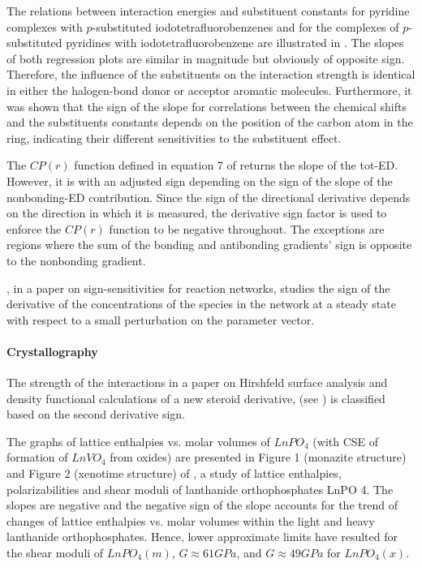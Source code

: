 \documentclass[11pt]{book}
\begin{document}
The relations between interaction energies and substituent constants
for pyridine complexes with $p$-substituted iodotetrafluorobenzenes
and for the complexes of $p$-substituted pyridines with iodotetrafluorobenzene
are illustrated in \cite{szatylowicz2015substituent}. The slopes
of both regression plots are similar in magnitude but obviously of
opposite sign. Therefore, the influence of the substituents on the
interaction strength is identical in either the halogen-bond donor
or acceptor aromatic molecules. Furthermore, it was shown that the
sign of the slope for correlations between the chemical shifts and
the substituents constants depends on the position of the carbon atom
in the ring, indicating their different sensitivities to the substituent
effect.

The $CP\left(r\right)$ function defined in equation 7 of \cite{de2018faldi}
returns the slope of the tot-ED. However, it is with an adjusted sign
depending on the sign of the slope of the nonbonding-ED contribution.
Since the sign of the directional derivative depends on the direction
in which it is measured, the derivative sign factor is used to enforce
the $CP\left(r\right)$ function to be negative throughout. The exceptions
are regions where the sum of the bonding and antibonding gradients'
sign is opposite to the nonbonding gradient.

\cite{feliu2019sign}, in a paper on sign-sensitivities for reaction networks, studies the sign of the derivative of the concentrations
of the species in the network at a steady state with respect to a
small perturbation on the parameter vector.
\paragraph{Crystallography}

The strength of the interactions in a paper on Hirshfeld surface analysis and density functional calculations
of a new steroid derivative, (see \cite{ruiz2014unusual}) is classified
based on the second derivative sign.

The graphs of lattice enthalpies vs. molar volumes of $LnPO_{4}$
(with CSE of formation of $LnVO_{4}$ from oxides) are presented in
Figure 1 (monazite structure) and Figure 2 (xenotime structure) of
\cite{petrov2014lattice}, a study of lattice enthalpies, polarizabilities and shear moduli of lanthanide orthophosphates
LnPO 4. The slopes are negative and the negative
sign of the slope accounts for the trend of changes of lattice enthalpies
vs. molar volumes within the light and heavy lanthanide orthophosphates.
Hence, lower approximate limits have resulted for the shear moduli
of $LnPO_{4}\left(m\right)$, $G\approx61GPa$, and $G\approx49GPa$
for $LnPO_{4}\left(x\right)$.
\end{document}
